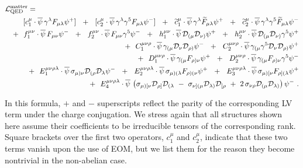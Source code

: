 \documentclass[12pt,preprintnumbers,nofootinbib]{revtex4}
\newcommand{\wt}{\widetilde}
\newcommand{\ov}{\overline}
\newcommand{\md}{\mathcal{D}}
\begin{document}
\begin{eqnarray}
\nonumber
\lefteqn{
	\mathcal{L}_{\rm QED}^{\rm matter} = 
	}
	\\
\nonumber
	&&
	\phantom{+~~}
	[c_1^{\mu}\cdot
	\ov{\psi}\, \gamma^\lambda F_{\mu\lambda} \psi {}^{+}] ~~+~~
	[c_2^{\mu}\cdot
	\ov{\psi}\, \gamma^\lambda \gamma^5 F_{\mu\lambda} \psi {}^{-}] ~~+~~
	\wt{c}_1^{\mu}\cdot
	\ov{\psi}\, \gamma^\lambda \wt{F}_{\mu\lambda} \psi {}^{+} ~~+~~
	\wt{c}_2^{\mu}\cdot
	\ov{\psi}\, \gamma^\lambda \gamma^5 \wt{F}_{\mu\lambda} \psi {}^{-}
	\\
\nonumber
	&&
	+~~
	f_1^{\mu\nu}\cdot
	\ov{\psi}\, F_{\mu\nu} \psi {}^{-} ~~+~~
	f_2^{\mu\nu}\cdot
	\ov{\psi}\, F_{\mu\nu} \gamma^5 \psi {}^{-} ~~+~~
	h_1^{\mu\nu}\cdot
	\ov{\psi}\, \mathcal{D}_{(\mu} \mathcal{D}_{\nu)} \psi {}^{+} ~~+~~
	h_2^{\mu\nu}\cdot
	\ov{\psi}\, \mathcal{D}_{(\mu} \mathcal{D}_{\nu)} \gamma^5 \psi {}^{+} 
	\\
\label{QED_matter}
	&&
	+~~
	C_1^{\mu\nu\rho}\cdot
	\ov{\psi}\, \gamma_{(\mu} 
		\mathcal{D}_\nu \mathcal{D}_{\rho)} \psi {}^{-} ~~+~~
	C_2^{\mu\nu\rho}\cdot
	\ov{\psi}\, \gamma_{(\mu} \gamma^5
	\mathcal{D}_\nu \mathcal{D}_{\rho)} \psi {}^{+} 
	\\
\nonumber
	&&
	+~~
	D_1^{\mu\nu\rho}\cdot
	\ov{\psi}\, \gamma_{(\mu} F_{\rho)\nu} \psi {}^{+} ~~+~~
	D_2^{\mu\nu\rho}\cdot
	\ov{\psi}\, \gamma_{(\mu} F_{\rho)\nu} \gamma^5 \psi {}^{-} 
	\\
\nonumber
	&&
	+~~
	E_1^{\mu\nu\rho\lambda}\cdot
	\ov{\psi}\, \sigma_{\mu)\nu} \mathcal{D}_{(\rho}\mathcal{D}_\lambda 
			\psi {}^{-} ~~+~~
	E_2^{\mu\nu\rho\lambda}\cdot
	\ov{\psi}\, \sigma_{\mu)(\lambda} F_{\rho)(\nu} \psi {}^{+} ~~+~~
	E_3^{\mu\nu\rho\lambda}\cdot
	\ov{\psi}\, \sigma_{\mu)[\nu} F_{\rho](\lambda} \psi {}^{+} 
	\\
\nonumber
	&&
	+~~
	E_4^{\mu\nu\rho\lambda}\cdot
	\ov{\psi}\, \left ( 
		\sigma_{\mu)[\nu} \mathcal{D}_{\rho]}\mathcal{D}_{(\lambda}
		~-~
		\sigma_{\nu](\mu} \mathcal{D}_{\lambda)}\mathcal{D}_{[\rho}
		~+~
		2\, \sigma_{\nu\rho} \md_{(\mu} \md_{\lambda)}
		\right ) \psi {}^{-} 
	~.
\end{eqnarray}

	In this formula,  $+$ and $-$ superscripts reflect
	the parity of the corresponding LV term under the charge conjugation.
	We stress again that all structures shown here assume
	their coefficients to be  irreducible tensors of the 
	corresponding rank. 
	Square brackets over the first two operators, $ c_1^\mu $ and $ c_2^\mu $, 
indicate that these two terms vanish upon the use of EOM, but we list them 
	for the reason they become nontrivial in the non-abelian case.
\end{document}
